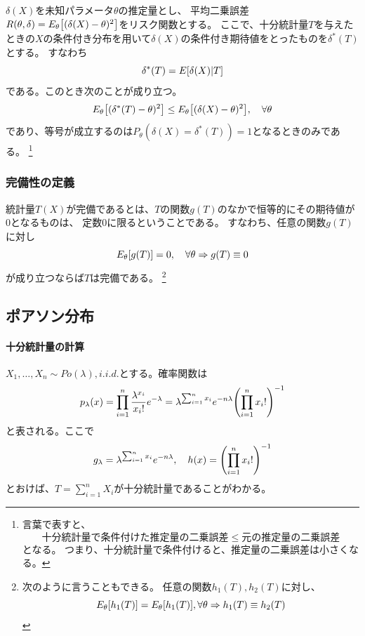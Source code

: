\(\delta(X)\)を未知パラメータ\(\theta\)の推定量とし、
平均二乗誤差\(R(\theta, \delta) = E_{\theta} \qty [(\delta(X) - \theta)^2] \)をリスク関数とする。
ここで、十分統計量\(T\)を与えたときの\(X\)の条件付き分布を用いて\(\delta(X)\)の条件付き期待値をとったものを\(\delta^{*}(T)\)とする。
すなわち
\begin{equation}
  \delta^{*}(T) = E \qty [ \delta(X) | T ]
\end{equation}
である。このとき次のことが成り立つ。
\begin{equation}
  E_{\theta} \qty [(\delta^{*}(T) - \theta)^2] \leq E_{\theta} \qty [(\delta(X) - \theta)^2], \quad \forall \theta
\end{equation}
であり、等号が成立するのは\(P_{\theta}(\delta(X) = \delta^{*}(T)) = 1\)となるときのみである。
\footnote{言葉で表すと、\[十分統計量で条件付けた推定量の二乗誤差 \leq 元の推定量の二乗誤差\]となる。
  つまり、十分統計量で条件付けると、推定量の二乗誤差は小さくなる。}

\subsubsection{完備性の定義}

統計量\(T(X)\)が完備であるとは、\(T\)の関数\(g(T)\)のなかで恒等的にその期待値が0となるものは、
定数0に限るということである。
すなわち、任意の関数\(g(T)\)に対し
\begin{equation}
  E_{\theta} \qty [g(T)] = 0, \quad \forall \theta \Rightarrow g(T) \equiv 0
\end{equation}
が成り立つならば\(T\)は完備である。
\footnote{次のように言うこともできる。
  任意の関数\(h_1(T), h_2(T)\)に対し、
  \[E_{\theta} \qty [h_1(T)] = E_{\theta} \qty [h_1(T)], \forall \theta \Rightarrow h_1(T) \equiv h_2(T)\]}

\subsection{ポアソン分布}

\paragraph{十分統計量の計算}

\(X_1, \dots, X_n \sim Po(\lambda), i.i.d.\)とする。確率関数は
\begin{equation}
  p_\lambda(x) = \prod_{i=1}^{n} \frac{\lambda^{x_i}}{x_i !} e^{- \lambda}
  = \lambda ^{\sum_{i=1}^{n} x_i} e^{-n \lambda} \qty ( \prod_{i=1}^{n} x_i ! ) ^{-1}
\end{equation}
と表される。ここで
\begin{equation}
  g_\lambda = \lambda ^{\sum_{i=1}^{n} x_i} e^{-n \lambda}, \quad h(x) = \qty ( \prod_{i=1}^{n} x_i ! ) ^{-1}
\end{equation}
とおけば、\(T = \sum_{i=1}^{n}X_i\)が十分統計量であることがわかる。


